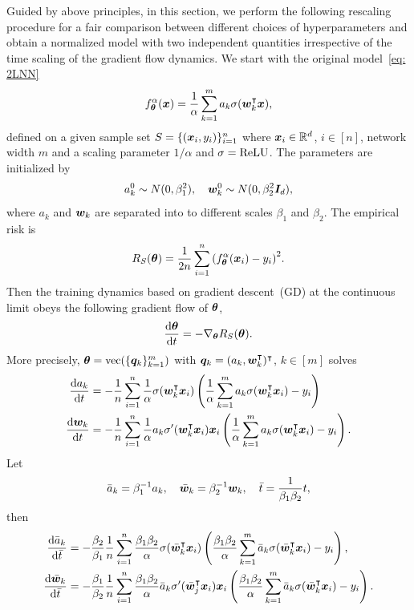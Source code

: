 \documentclass{article}
\begin{document}
Guided by above principles, in this section, we perform the following rescaling procedure for a fair comparison between different choices of hyperparameters and obtain a normalized model with two independent quantities irrespective of the time scaling of the gradient flow dynamics.
We start with the original model~\eqref{eq: 2LNN}
\begin{equation}
    f^{\alpha}_{\bm{\theta}}(\bm{x}) = \frac{1}{\alpha}\sum_{k=1}^{m}a_k\sigma(\bm{w}_k^{\intercal}\bm{x}),
\end{equation}
defined on a given sample set $S=\{(\bm{x}_i,y_i)\}_{i=1}^n$ where $\bm{x}_i\in\mathbb{R}^d$, $i\in[n]$, network width $m$ and a scaling parameter $1/\alpha$ and $\sigma=\mathrm{ReLU}$. The parameters are initialized by
\begin{equation}
    a_k^0\sim N(0, \beta_1^2), \quad \bm{w}_k^0\sim N(0, \beta_2^2 \bm{I}_d),
\end{equation}
where $a_k$ and $\bm{w}_k$ are separated into to different scales $\beta_1$ and $\beta_2$. The empirical risk is
\begin{equation}
    R_S(\bm{\theta})=\frac{1}{2n}\sum_{i=1}^n {(f^{\alpha}_{\bm{\theta}}(\bm{x}_i)-y_i)}^2.
\end{equation}
Then the training dynamics based on gradient descent~(GD) at the continuous limit obeys the following gradient flow of $\bm{\theta}$,
\begin{equation}
    \frac{\mathrm{d} \bm{\theta}}{\mathrm{d} t}=-\nabla_{\bm{\theta}}R_S(\bm{\theta}).
\end{equation}
More precisely, $\bm{\theta}=\mathrm{vec}(\{\bm{q}_k\}_{k=1}^m)$ with $\bm{q}_k=(a_k,\bm{w}_k^{\intercal})^\intercal$, $k\in[m]$ solves
\begin{align*}
    \frac{\mathrm{d} a_k}{\mathrm{d} t}
     & = -\frac{1}{n}\sum_{i=1}^n\frac{1}{\alpha}\sigma(\bm{w}_k^{\intercal}\bm{x}_i) \left(\frac{1}{\alpha}\sum_{k=1}^{m}a_k\sigma(\bm{w}_k^{\intercal}\bm{x}_i)-y_i\right)            \\
    \frac{\mathrm{d} \bm{w}_k}{\mathrm{d} t}
     & = -\frac{1}{n}\sum_{i=1}^n\frac{1}{\alpha} a_k\sigma'(\bm{w}_k^{\intercal}\bm{x}_i)\bm{x}_i \left(\frac{1}{\alpha}\sum_{k=1}^{m}a_k\sigma(\bm{w}_k^{\intercal}\bm{x}_i)-y_i\right).
\end{align*}
Let
\begin{equation}
    \bar{a}_k=\beta_1^{-1}a_k, \quad \bar{\bm{w}}_k=\beta_2^{-1}\bm{w}_k,\quad \bar{t}=\frac{1}{\beta_1\beta_2}t,
\end{equation}
then
\begin{align*}
    \frac{\mathrm{d} \bar{a}_k}{\mathrm{d} \bar{t}}
     & = -\frac{\beta_2}{\beta_1}\frac{1}{n}\sum_{i=1}^n \frac{\beta_1\beta_2}{\alpha}\sigma(\bar{\bm{w}}_k^\intercal\bm{x}_i) \left(\frac{\beta_1\beta_2}{\alpha}\sum_{k=1}^{m}\bar{a}_k\sigma(\bar{\bm{w}}_k^\intercal\bm{x}_i)-y_i\right),               \\
    \frac{\mathrm{d} \bar{\bm{w}}_k}{\mathrm{d} \bar{t}}
     & = -\frac{\beta_1}{\beta_2}\frac{1}{n}\sum_{i=1}^n\frac{\beta_1\beta_2}{\alpha}\bar{a}_k\sigma'(\bar{\bm{w}}_j^\intercal\bm{x}_i)\bm{x}_i \left(\frac{\beta_1\beta_2}{\alpha}\sum_{k=1}^{m}\bar{a}_k\sigma(\bar{\bm{w}}_k^\intercal\bm{x}_i)-y_i\right).
\end{align*}
\end{document}
